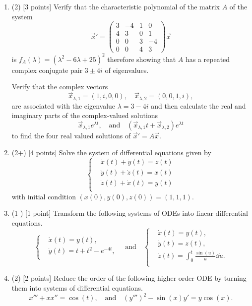 \documentclass[12pt]{article}
\begin{document}
\begin{enumerate}
   \item (2) [3 points] Verify that the characteristic polynomial of the matrix \(A\) of the system 
   \[
   \vec{x}'=\begin{pmatrix}
      3&-4&1&0\\4&3&0&1\\0&0&3&-4\\0&0&4&3
   \end{pmatrix}\vec{x}
   \]
   is \(f_A(\lambda)=(\lambda^2-6\lambda+25)^2\) therefore showing that \(A\) has a repeated complex conjugate pair \(3\pm 4i\) of eigenvalues.\par
   Verify that the complex vectors 
   \[
   \vec{x}_{\lambda,1}=(1,i,0,0),\quad\vec{x}_{\lambda,2}=(0,0,1,i),
   \]
   are associated with the eigenvalue \(\lambda=3-4i\) and then calculate the real and imaginary parts of the complex-valued solutions 
   \[
   \vec{x}_{\lambda,1}e^{\lambda t},\quad\text{and}\quad(\vec{x}_{\lambda,1}t+\vec{x}_{\lambda,2})e^{\lambda t}
   \]
   to find the four real valued solutions of \(\vec{x}'=A\vec{x}\).

    \item (2+) [4 points] Solve the system of differential equations given by 
   \[
   \left\lbrace
   \begin{aligned}
      &\dot{x}(t)+\dot{y}(t)=z(t)\\
      &\dot{y}(t)+\dot{z}(t)=x(t)\\
      &\dot{z}(t)+\dot{x}(t)=y(t)\\
   \end{aligned}
   \right.
   \]
   with initial condition \((x(0),y(0),z(0))=(1,1,1)\).

    \item (1-) [1 point] Transform the following systems of ODEs into linear differential equations.
    \[
   \left\lbrace
   \begin{aligned}
      &\dot{x}(t)=y(t),\\
      &\dot{y}(t)=t+t^2-e^{-4t},\\
   \end{aligned}
   \right.
   \quad\text{and}\quad
   \left\lbrace
   \begin{aligned}
      &\dot{x}(t)=y(t),\\
      &\dot{y}(t)=z(t),\\
      &\dot{z}(t)=\int_0^t\frac{\sin(u)}{u}\dd u.\\
   \end{aligned}
   \right.
   \]

   \item (2) [2 points] Reduce the order of the following higher order ODE by turning them into systems of differential equations.
   \[
   x'''+xx''=\cos(t),\quad\text{and}\quad (y''')^2-\sin(x)y'=y\cos(x).
   \]


\end{enumerate}
\end{document}

